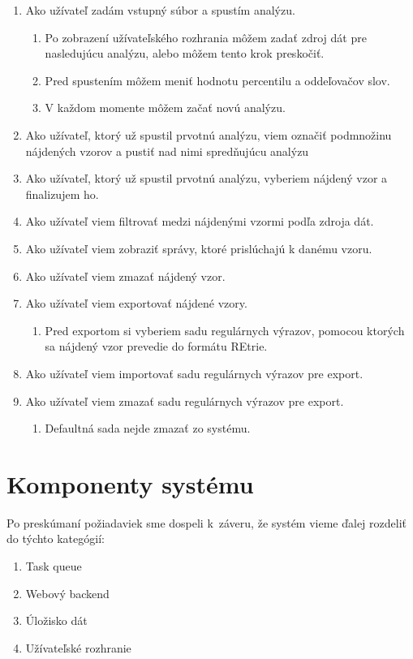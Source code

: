 \begin{enumerate}
  \item Ako užívateľ zadám vstupný súbor a spustím analýzu.
  \begin{enumerate}
  	\item Po zobrazení užívateľského rozhrania môžem zadať zdroj dát pre nasledujúcu analýzu, alebo môžem tento krok preskočiť.
  	\item Pred spustením môžem meniť hodnotu percentilu a oddeľovačov slov.
  	\item V každom momente môžem začať novú analýzu.
  \end{enumerate}
  \item Ako užívateľ, ktorý už spustil prvotnú analýzu, viem označiť podmnožinu nájdených vzorov a pustiť nad nimi spredňujúcu analýzu
  \item Ako užívateľ, ktorý už spustil prvotnú analýzu, vyberiem nájdený vzor a finalizujem ho.
  \item Ako užívateľ viem filtrovať medzi nájdenými vzormi podľa zdroja dát.
  \item Ako užívateľ viem zobraziť správy, ktoré prislúchajú k danému vzoru.
  \item Ako užívateľ viem zmazať nájdený vzor.
  \item Ako užívateľ viem exportovať nájdené vzory.
  \begin{enumerate}
  	\item Pred exportom si vyberiem sadu regulárnych výrazov, pomocou ktorých sa nájdený vzor prevedie do formátu REtrie.
  \end{enumerate}
  \item Ako užívateľ viem importovať sadu regulárnych výrazov pre export.
  \item Ako užívateľ viem zmazať sadu regulárnych výrazov pre export.
  \begin{enumerate}
  	\item Defaultná sada nejde zmazať zo systému.
  \end{enumerate}
\end{enumerate}

\section{Komponenty systému}
Po preskúmaní požiadaviek sme dospeli k~záveru, že systém vieme ďalej rozdeliť do týchto kategógií:

\begin{enumerate}
  \item Task queue
  \item Webový backend
  \item Úložisko dát
  \item Užívateľské rozhranie
\end{enumerate}

